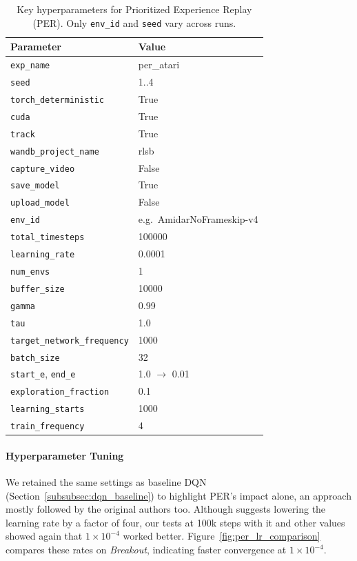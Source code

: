 \begin{table}
	\caption{Key hyperparameters for Prioritized Experience Replay (PER). Only \texttt{env\_id} and \texttt{seed} vary across runs.}
	\label{tab:per_hyperparams}
	\centering
	\begin{tabular}{ll}
		\toprule
		\textbf{Parameter} & \textbf{Value} \\
		\midrule
		\texttt{exp\_name}                & per\_atari \\
		\texttt{seed}                     & 1..4 \\
		\texttt{torch\_deterministic}     & True \\
		\texttt{cuda}                     & True \\
		\texttt{track}                    & True \\
		\texttt{wandb\_project\_name}     & rlsb \\
		\texttt{capture\_video}           & False \\
		\texttt{save\_model}              & True \\
		\texttt{upload\_model}            & False \\
		\texttt{env\_id}                  & e.g.\ AmidarNoFrameskip-v4 \\
		\texttt{total\_timesteps}         & 100000 \\
		\texttt{learning\_rate}           & 0.0001 \\
		\texttt{num\_envs}                & 1 \\
		\texttt{buffer\_size}             & 10000 \\
		\texttt{gamma}                    & 0.99 \\
		\texttt{tau}                      & 1.0 \\
		\texttt{target\_network\_frequency} & 1000 \\
		\texttt{batch\_size}             & 32 \\
		\texttt{start\_e}, \texttt{end\_e} & 1.0 $\to$ 0.01 \\
		\texttt{exploration\_fraction}    & 0.1 \\
		\texttt{learning\_starts}         & 1000 \\
		\texttt{train\_frequency}         & 4 \\
		\bottomrule
	\end{tabular}
\end{table}

\paragraph{Hyperparameter Tuning}
We retained the same settings as baseline DQN (Section~\ref{subsubsec:dqn_baseline}) to highlight PER's impact alone, an approach mostly followed by the original authors too. Although \cite{schaul:prioritized} suggests lowering the learning rate by a factor of four, our tests at 100k steps with it and other values showed again that $1\times10^{-4}$ worked better. Figure~\ref{fig:per_lr_comparison} compares these rates on \emph{Breakout}, indicating faster convergence at $1\times10^{-4}$.  

